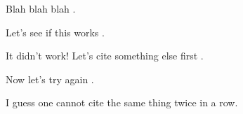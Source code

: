 \documentclass{article}
\begin{document}
Blah blah blah \citep{CharnessDufwenberg2006}.

Let's see if this works \citep[\textit{c.f.},][]{CharnessDufwenberg2006}.

It didn't work! Let's cite something else first \citep{BeattieLoomes1997}.

Now let's try again \citep[\textit{c.f.},][]{CharnessDufwenberg2006}.

I guess one cannot cite the same thing twice in a row.
\end{document}
